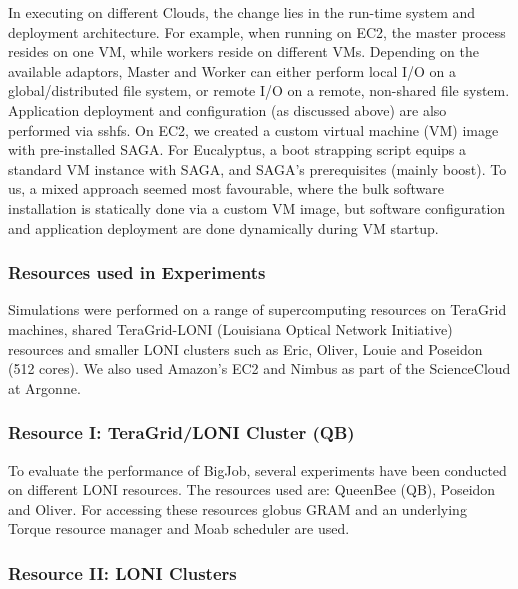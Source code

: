 \documentclass[3p,twocolumn]{elsarticle}
\begin{document}
In executing \sagamapreduce on different Clouds, the change lies in
the run-time system and deployment architecture. For example, when
running \sagamapreduce on EC2, the master process resides on one VM,
while workers reside on different VMs.  Depending on the available
adaptors, Master and Worker can either perform local I/O on a
global/distributed file system, or remote I/O on a remote, non-shared
file system.  %
Application deployment and configuration (as discussed above) are also
performed via sshfs.  On EC2, we created a custom virtual machine
(VM) image with pre-installed SAGA.  For Eucalyptus, a boot strapping
script equips a standard VM instance with SAGA, and SAGA's
prerequisites (mainly boost).  To us, a mixed approach seemed most
favourable, where the bulk software installation is statically done
via a custom VM image, but software configuration and application
deployment are done dynamically during VM startup.

\subsubsection{Resources used in Experiments}

Simulations were performed on a range of supercomputing resources on
TeraGrid machines, shared TeraGrid-LONI (Louisiana Optical Network
Initiative)~\cite{LONI_web} resources and smaller LONI clusters such
as Eric, Oliver, Louie and Poseidon (512 cores).  We also used
Amazon's EC2 and Nimbus as part of the ScienceCloud at Argonne.

\subsubsection*{Resource I: TeraGrid/LONI Cluster (QB)}

To evaluate the performance of BigJob, several experiments have been
conducted on different LONI resources. The resources used are:
QueenBee (QB), Poseidon and Oliver. For accessing these resources
globus GRAM and an underlying Torque resource manager and Moab
scheduler are used.

\subsubsection*{Resource II: LONI Clusters}
\end{document}
